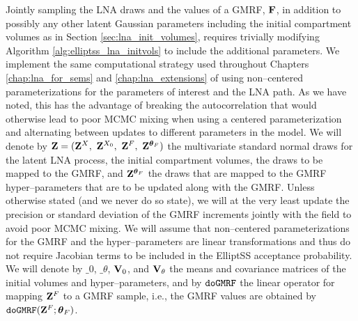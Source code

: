 Jointly sampling the LNA draws and the values of a GMRF, $ \mathbf{F} $, in addition to possibly any other latent Gaussian parameters including the initial compartment volumes as in Section \ref{sec:lna_init_volumes}, requires trivially modifying Algorithm \ref{alg:elliptss_lna_initvols} to include the additional parameters. We implement the same computational strategy used throughout Chapters \ref{chap:lna_for_sems} and \ref{chap:lna_extensions} of using non--centered parameterizations for the parameters of interest and the LNA path. As we have noted, this has the advantage of breaking the autocorrelation that would otherwise lead to poor MCMC mixing when using a centered parameterization and alternating between updates to different parameters in the model. We will denote by $ \bZ = (\bZ^X,\ \bZ^{X_0},\ \bZ^F,\ \bZ^{\btheta_F}) $ the multivariate standard normal draws for the latent LNA process, the initial compartment volumes, the draws to be mapped to the GMRF, and $ \mathbf{Z}^{\boldsymbol{\theta}_F} $ the draws that are mapped to the GMRF hyper--parameters that are to be updated along with the GMRF. Unless otherwise stated (and we never do so state), we will at the very least update the precision or standard deviation of the GMRF increments jointly with the field to avoid poor MCMC mixing. We will assume that non--centered parameterizations for the GMRF and the hyper--parameters are linear transformations and thus do not require Jacobian terms to be included in the ElliptSS acceptance probability. We will denote by $ \bm_0 $, $ \bm_\theta $, $ \mathbf{V}_0 $, and $ \mathbf{V}_\theta $ the means and covariance matrices of the initial volumes and hyper--parameters, and by $ \texttt{doGMRF} $ the linear operator for mapping $ \mathbf{Z}^F $ to a GMRF sample, i.e., the GMRF values are obtained by $ \texttt{doGMRF}(\mathbf{Z}^F; \boldsymbol{\theta}_F) $. 

